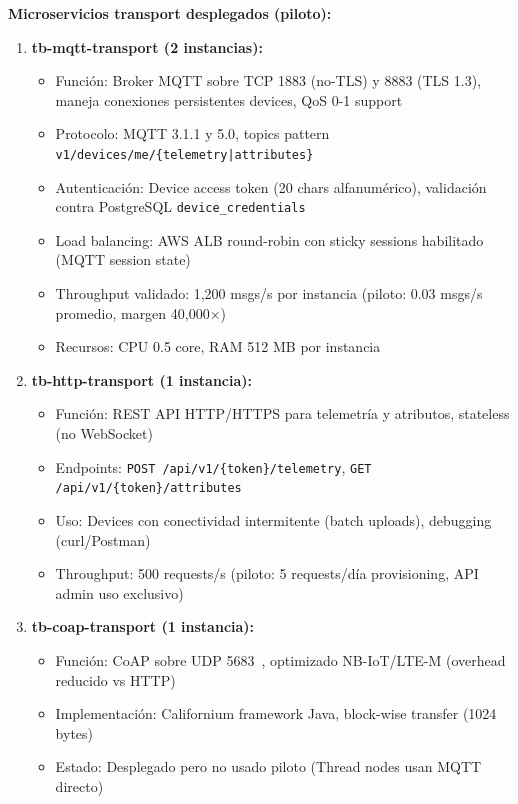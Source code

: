 \textbf{Microservicios transport desplegados (piloto):}

\begin{enumerate}
    \item \textbf{tb-mqtt-transport (2 instancias):}
    \begin{itemize}
        \item Función: Broker MQTT sobre TCP 1883 (no-TLS) y 8883 (TLS 1.3), maneja conexiones persistentes devices, QoS 0-1 support~\cite{amiriDeploymentArchitecturesMQTT2024}
        \item Protocolo: MQTT 3.1.1 y 5.0, topics pattern \texttt{v1/devices/me/\{telemetry|attributes\}}
        \item Autenticación: Device access token (20 chars alfanumérico), validación contra PostgreSQL \texttt{device\_credentials}
        \item Load balancing: AWS ALB round-robin con sticky sessions habilitado (MQTT session state)
        \item Throughput validado: 1,200 msgs/s por instancia (piloto: 0.03 msgs/s promedio, margen 40,000×)
        \item Recursos: CPU 0.5 core, RAM 512 MB por instancia
    \end{itemize}
    
    \item \textbf{tb-http-transport (1 instancia):}
    \begin{itemize}
        \item Función: REST API HTTP/HTTPS para telemetría y atributos, stateless (no WebSocket)
        \item Endpoints: \texttt{POST /api/v1/\{token\}/telemetry}, \texttt{GET /api/v1/\{token\}/attributes}
        \item Uso: Devices con conectividad intermitente (batch uploads), debugging (curl/Postman)
        \item Throughput: 500 requests/s (piloto: 5 requests/día provisioning, API admin uso exclusivo)
    \end{itemize}
    
    \item \textbf{tb-coap-transport (1 instancia):}
    \begin{itemize}
        \item Función: CoAP sobre UDP 5683~\cite{RFC7252}, optimizado NB-IoT/LTE-M (overhead reducido vs HTTP)
        \item Implementación: Californium framework Java, block-wise transfer (1024 bytes)
        \item Estado: Desplegado pero no usado piloto (Thread nodes usan MQTT directo)
    \end{itemize}
\end{enumerate}

